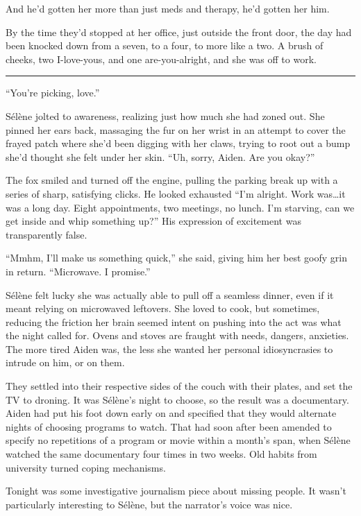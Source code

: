 And he'd gotten her more than just meds and therapy, he'd gotten her him.

By the time they'd stopped at her office, just outside the front door, the day had been knocked down from a seven, to a four, to more like a two. A brush of cheeks, two I-love-yous, and one are-you-alright, and she was off to work.

\begin{center}\rule{0.5\linewidth}{\linethickness}\end{center}

``You're picking, love.''

Sélène jolted to awareness, realizing just how much she had zoned out. She pinned her ears back, massaging the fur on her wrist in an attempt to cover the frayed patch where she'd been digging with her claws, trying to root out a bump she'd thought she felt under her skin. ``Uh, sorry, Aiden. Are you okay?''

The fox smiled and turned off the engine, pulling the parking break up with a series of sharp, satisfying clicks. He looked exhausted ``I'm alright. Work was\ldots{}it was a long day. Eight appointments, two meetings, no lunch. I'm starving, can we get inside and whip something up?'' His expression of excitement was transparently false.

``Mmhm, I'll make us something quick,'' she said, giving him her best goofy grin in return. ``Microwave. I promise.''

Sélène felt lucky she was actually able to pull off a seamless dinner, even if it meant relying on microwaved leftovers. She loved to cook, but sometimes, reducing the friction her brain seemed intent on pushing into the act was what the night called for. Ovens and stoves are fraught with needs, dangers, anxieties. The more tired Aiden was, the less she wanted her personal idiosyncrasies to intrude on him, or on them.

They settled into their respective sides of the couch with their plates, and set the TV to droning. It was Sélène's night to choose, so the result was a documentary. Aiden had put his foot down early on and specified that they would alternate nights of choosing programs to watch. That had soon after been amended to specify no repetitions of a program or movie within a month's span, when Sélène watched the same documentary four times in two weeks. Old habits from university turned coping mechanisms.

Tonight was some investigative journalism piece about missing people. It wasn't particularly interesting to Sélène, but the narrator's voice was nice.

